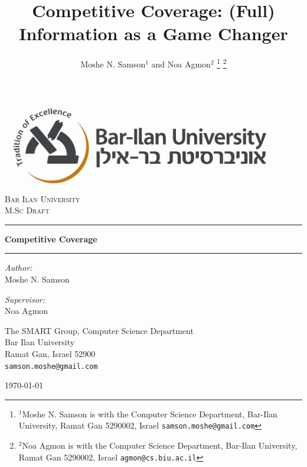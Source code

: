 \documentclass[a4paper,11pt]{article}
\title{\LARGE \bf
Competitive  Coverage:  (Full)  Information  as  a  Game  Changer}
\author{Moshe N. Samson$^{1}$ and Noa Agmon$^{2}$%
\thanks{$^{1}$Moshe N. Samson is with the Computer Science Department,
        Bar-Ilan University, Ramat Gan 5290002, Israel
        {\tt\small samson.moshe@gmail.com}}%
\thanks{$^{2}$Noa Agmon is with the Computer Science Department, Bar-Ilan University, Ramat Gan 5290002, Israel
        {\tt\small agmon@cs.biu.ac.il}}%
}
\theoremstyle{definition}
\begin{document}
\begin{titlepage}
\begin{center}


\includegraphics[width=0.9\textwidth]{Images/logo.jpg}\\[1cm]
\textsc{\LARGE Bar Ilan University}\\[1.5cm]
\textsc{\Large M.Sc Draft}\\[0.5cm]

\hrule
{ \vspace{2 mm} }
{ \huge \bfseries Competitive Coverage}
{ \vspace{3 mm} }
\hrule
{ \vspace{8 mm} }

\begin{minipage}{0.4\textwidth}
\begin{flushleft} \large
\emph{Author:}\\
Moshe N. Samson 

\end{flushleft}
\end{minipage}
\begin{minipage}{0.4\textwidth}
\begin{flushleft} \large
\emph{Supervisor:} \\
Noa Agmon
\end{flushleft}
\end{minipage}


\vfill


\large{The SMART Group, Computer Science Department\\
Bar Ilan University\\
Ramat Gan, Israel 52900\\
\tt\small samson.moshe@gmail.com}

\vfill

\today

\end{center}
\end{titlepage}
\end{document}
